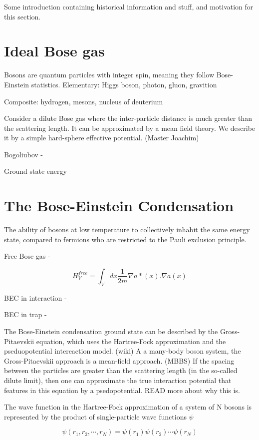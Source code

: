 Some introduction containing historical information and stuff, and motivation for this section.

\section{Ideal Bose gas}
Bosons are quantum particles with integer spin, meaning they follow Bose-Einstein statistics. 
Elementary: Higgs boson, photon, gluon, gravition

Composite: hydrogen, mesons, nucleus of deuterium

Consider a dilute Bose gas where the inter-particle distance is much greater than the scattering length. It can be approximated by a mean field theory. We describe it by a simple hard-sphere effective potential. (Master Joachim)

Bogoliubov - 

Ground state energy

\section{The Bose-Einstein Condensation}
The ability of bosons at low temperature to collectively inhabit the same energy state, compared to fermions who are restricted to the Pauli exclusion principle.

Free Bose gas - 

\begin{equation} \label{eq:hamilt_free_bose_gas}
H^{free}_V = \int_V dx \frac{1}{2m} \nabla a*(x). \nabla a(x)
\end{equation}

BEC in interaction - 

BEC in trap - 

The Bose-Einstein condensation ground state can be described by the Gross-Pitaevskii equation, which uses the Hartree-Fock approximation and the pseduopotential intereaction model. (wiki) 
A a many-body boson system, the Gross-Pitaevskii approach is a mean-field approach. (MBBS)
If the spacing between the particles are greater than the scattering length (in the so-called dilute limit), then one can approximate the true interaction potential that features in this equation by a psedopotential. READ more about why this is.

The wave function in the Hartree-Fock approximation of a system of N bosons is represented by the product of single-particle wave functions $\psi$

\begin{equation}
\psi(r_1, r_2, \cdots, r_N) = \psi(r_1) \psi(r_2) \cdots \psi(r_N)
\end{equation}

